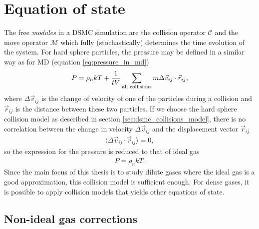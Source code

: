 \section{Equation of state}
\label{sec:dsmc_eos}
The free \textit{modules} in a DSMC simulation are the collision operator $\mathcal C$ and the move operator $\mathcal M$ which fully (stochastically) determines the time evolution of the system. For hard sphere particles, the pressure may be defined in a similar way as for MD (equation \eqref{eq:pressure_in_md})
\begin{align}
	P = \rho_nkT + {1\over tV}\sum_\text{all collisions} m\Delta \vec v_{ij}\cdot \vec r_{ij},
\end{align}
where $\Delta \vec v_{ij}$ is the change of velocity of one of the particles during a collision and $\vec r_{ij}$ is the distance between these two particles\cite{garcia1997direct}. If we choose the hard sphere collision model as described in section \ref{sec:dsmc_collisions_model}, there is no correlation between the change in velocity $\Delta \vec v_{ij}$ and the displacement vector $\vec r_{ij}$
\begin{align}
	\langle \Delta \vec v_{ij}\cdot \vec r_{ij}\rangle = 0,
\end{align}
so the expression for the pressure is reduced to that of ideal gas
\begin{align}
	P = \rho_n kT.
\end{align}
Since the main focus of this thesis is to study dilute gases where the ideal gas is a good approximation, this collision model is sufficient enough. For dense gases, it is possible to apply collision models that yields other equations of state.
\subsection{Non-ideal gas corrections}